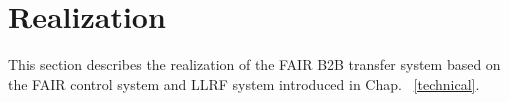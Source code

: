 %
% 
\section{Realization}
\label{cpt_func}
This section describes the realization of the FAIR B2B transfer system based on the FAIR control system and LLRF system introduced in Chap. ~\ref{technical}.

